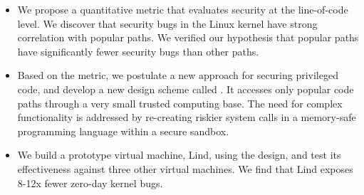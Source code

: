 \begin{itemize}\setlength\itemsep{0em}

\item
We propose a quantitative metric that evaluates security at the line-of-code level. 
We discover that security bugs in the Linux kernel have strong correlation with popular paths. 
We verified our hypothesis that popular paths have significantly fewer security bugs than other paths. 

\item
Based on the metric, we postulate a new approach for securing privileged code,
and develop a new design scheme called \lip. It
accesses only popular code paths
through a very small trusted computing base.
The need for complex functionality is addressed by re-creating riskier system calls
in a memory-safe programming language within a secure sandbox.

\item
We build a prototype virtual machine, Lind, using the \lip design,
and test its effectiveness against three other virtual machines. We find that
Lind exposes 8-12x fewer zero-day kernel bugs. 
\end{itemize}

